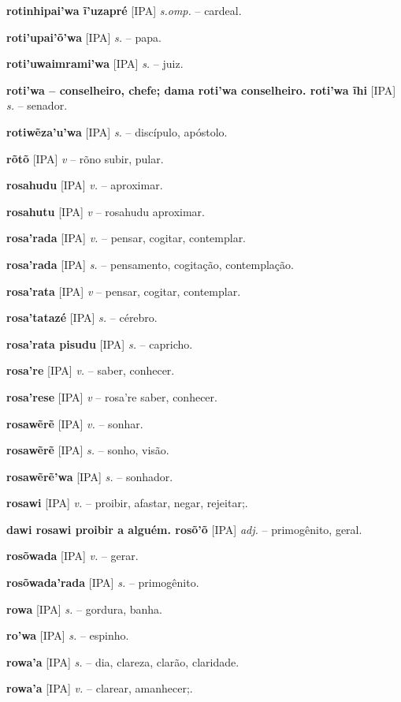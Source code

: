 \textbf{rotinhipai'wa ĩ'uzapré} [IPA] \textit{s.omp.} -- cardeal.

\textbf{roti'upai'õ'wa} [IPA] \textit{s.} -- papa.

\textbf{roti'uwaimrami'wa} [IPA] \textit{s.} -- juiz.

\textbf{roti'wa -- conselheiro, chefe; dama roti'wa conselheiro. roti'wa ĩhi} [IPA] \textit{s.} -- senador.

\textbf{rotiwẽza'u'wa} [IPA] \textit{s.} -- discípulo, apóstolo.

\textbf{rõtõ} [IPA] \textit{v} -- rõno subir, pular.

\textbf{rosahudu} [IPA] \textit{v.} -- aproximar.

\textbf{rosahutu} [IPA] \textit{v} -- rosahudu aproximar.

\textbf{rosa'rada} [IPA] \textit{v.} -- pensar, cogitar, contemplar.

\textbf{rosa'rada} [IPA] \textit{s.} -- pensamento, cogitação, contemplação.

\textbf{rosa'rata} [IPA] \textit{v} -- pensar, cogitar, contemplar.

\textbf{rosa'tatazé} [IPA] \textit{s.} -- cérebro.

\textbf{rosa'rata pisudu} [IPA] \textit{s.} -- capricho.

\textbf{rosa're} [IPA] \textit{v.} -- saber, conhecer.

\textbf{rosa'rese} [IPA] \textit{v} -- rosa're saber, conhecer.

\textbf{rosawẽrẽ} [IPA] \textit{v.} -- sonhar.

\textbf{rosawẽrẽ} [IPA] \textit{s.} -- sonho, visão.

\textbf{rosawẽrẽ'wa} [IPA] \textit{s.} -- sonhador.

\textbf{rosawi} [IPA] \textit{v.} -- proibir, afastar, negar, rejeitar;.

\textbf{dawi rosawi proibir a alguém. rosõ'õ} [IPA] \textit{adj.} -- primogênito, geral.

\textbf{rosõwada} [IPA] \textit{v.} -- gerar.

\textbf{rosõwada'rada} [IPA] \textit{s.} -- primogênito.

\textbf{rowa} [IPA] \textit{s.} -- gordura, banha.

\textbf{ro'wa} [IPA] \textit{s.} -- espinho.

\textbf{rowa'a} [IPA] \textit{s.} -- dia, clareza, clarão, claridade.

\textbf{rowa'a} [IPA] \textit{v.} -- clarear, amanhecer;.


